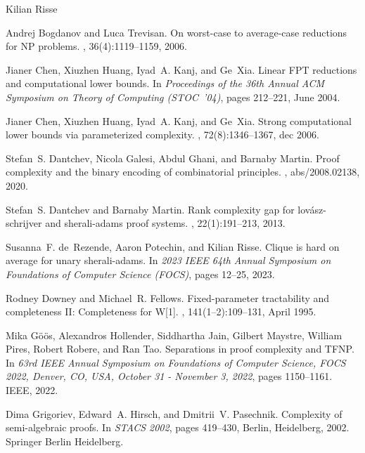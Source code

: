 \documentclass[report]{owrart}
\begin{document}
\begin{report}
\begin{talk}{Kilian Risse}
\begin{thebibliography}{99}
      Andrej Bogdanov and Luca Trevisan.
      \newblock On worst-case to average-case reductions for {NP} problems.
      , 36(4):1119--1159, 2006.
      
      Jianer Chen, Xiuzhen Huang, Iyad~A. Kanj, and Ge~Xia.
      \newblock Linear {FPT} reductions and computational lower bounds.
      \newblock In {\em Proceedings of the 36th Annual ACM Symposium on Theory of
        Computing ({STOC}~'04)}, pages 212--221, June 2004.
      
      Jianer Chen, Xiuzhen Huang, Iyad~A. Kanj, and Ge~Xia.
      \newblock Strong computational lower bounds via parameterized complexity.
      , 72(8):1346–1367, dec 2006.
      
      Stefan~S. Dantchev, Nicola Galesi, Abdul Ghani, and Barnaby Martin.
      \newblock Proof complexity and the binary encoding of combinatorial principles.
      , abs/2008.02138, 2020.
      
      Stefan~S. Dantchev and Barnaby Martin.
      \newblock Rank complexity gap for lov{\'{a}}sz-schrijver and sherali-adams
        proof systems.
      , 22(1):191--213, 2013.
      
      Susanna~F. de~Rezende, Aaron Potechin, and Kilian Risse.
      \newblock Clique is hard on average for unary sherali-adams.
      \newblock In {\em 2023 IEEE 64th Annual Symposium on Foundations of Computer
        Science (FOCS)}, pages 12--25, 2023.
      
      Rodney Downey and Michael~R. Fellows.
      \newblock Fixed-parameter tractability and completeness {II}: {C}ompleteness
        for {W[1]}.
      , 141(1--2):109--131, April 1995.
      
      Mika G{\"{o}}{\"{o}}s, Alexandros Hollender, Siddhartha Jain, Gilbert Maystre,
        William Pires, Robert Robere, and Ran Tao.
      \newblock Separations in proof complexity and {TFNP}.
      \newblock In {\em 63rd {IEEE} Annual Symposium on Foundations of Computer
        Science, {FOCS} 2022, Denver, CO, USA, October 31 - November 3, 2022}, pages
        1150--1161. {IEEE}, 2022.
      
      Dima Grigoriev, Edward~A. Hirsch, and Dmitrii~V. Pasechnik.
      \newblock Complexity of semi-algebraic proofs.
      \newblock In {\em STACS 2002}, pages 419--430, Berlin, Heidelberg, 2002.
        Springer Berlin Heidelberg.
      

\end{thebibliography}
\end{talk}
\end{report}
\end{document}
